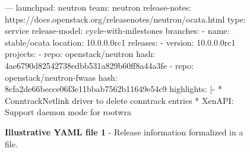 \documentclass[dvipsnames]{bmcart}
\theoremstyle{definition}
\begin{document}
\begin{figure}[h] 
 \footnotesize
\begin{numVblock}
---
launchpad: neutron
team: neutron
release-notes: https://docs.openstack.org/releasenotes/neutron/ocata.html
type: service
release-model: cycle-with-milestones
branches:
  - name: stable/ocata
    location: 10.0.0.0rc1
releases:
  - version: 10.0.0.0rc1
    projects:
      - repo: openstack/neutron
        hash: 4ae6790d82542738edbb531a829b60ff8a44a3fe
      - repo: openstack/neutron-fwaas
        hash: 8cfa2de66becce06f3e11bbab7562b11649e54c9
    highlights: |-
      * ConntrackNetlink driver to delete conntrack entries
      * XenAPI: Support daemon mode for rootwra 
      
\end{numVblock}
\raggedright{\sffamily  \par \textbf{\hypertarget{hl1}{Illustrative YAML file 1}} - Release information formalized in a file. }
\end{figure}


\end{document}
